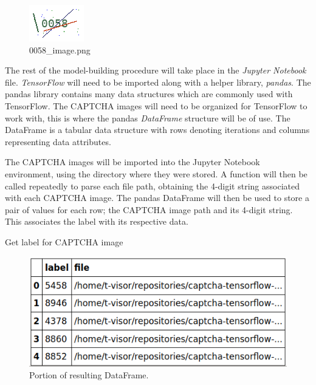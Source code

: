 \documentclass[11pt,conference]{IEEEtran}
\begin{document}
\begin{figure}[htbp]
	\centerline{\includegraphics[scale=1.5]{images/0058_image.png}}
	\caption{0058\_image.png}
	\label{figure}
\end{figure}

The rest of the model-building procedure will take place in the \emph{Jupyter
Notebook}
file. \emph{TensorFlow} will need to be imported along with a helper library,
\emph{pandas}. The pandas library contains many data structures which are
commonly used with TensorFlow. The CAPTCHA images will need to be organized for
TensorFlow to work with, this is where the pandas \emph{DataFrame} structure
will be of use. The DataFrame is a tabular data
structure with rows denoting iterations and columns representing data
attributes.

The CAPTCHA images will be imported into the Jupyter Notebook environment,
using the directory where they were stored. A function will then
be called repeatedly to parse each file path, obtaining the 4-digit string associated with each
CAPTCHA image. The pandas DataFrame will then be used to store a pair of values
for each row; the CAPTCHA image path and its 4-digit string. This
associates the label with its respective data.


\begin{algorithm}[]

  \caption{Get label for CAPTCHA image}
  \label{alg:exep}
\end{algorithm}

\begin{figure}[htbp]
	\centerline{\includegraphics[scale=0.5]{images/pandas-dataframe.png}}
	\caption{Portion of resulting DataFrame.}
	\label{figure}
\end{figure}
\end{document}
